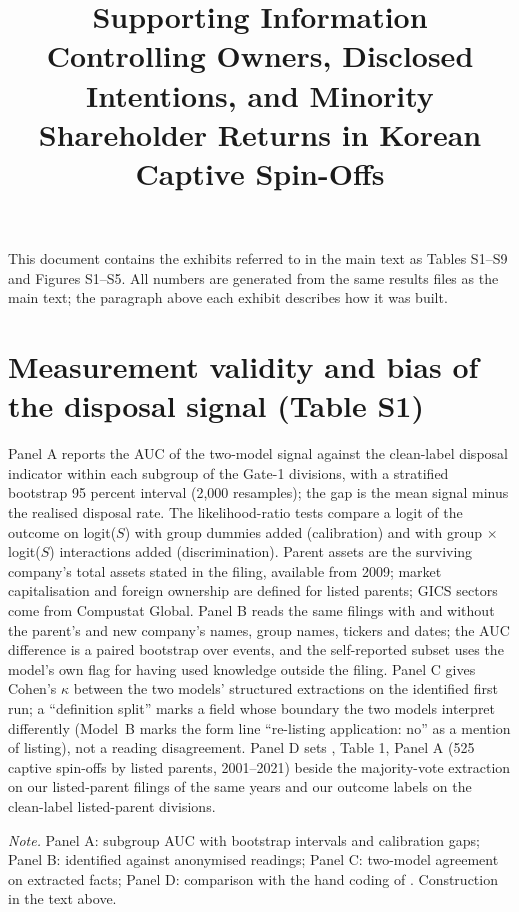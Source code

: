 \documentclass[12pt]{article}
\title{Supporting Information\\[4pt]\large Controlling Owners, Disclosed Intentions, and Minority Shareholder Returns in Korean Captive Spin-Offs}\author{}\date{}
\newcommand{\tabnote}[1]{\par\vspace{4pt}\begin{minipage}{\linewidth}\singlespacing\small\emph{Note.} #1\end{minipage}}
\newcommand{\captive}{captive spin-off}
\begin{document}
\maketitle
\noindent This document contains the exhibits referred to in the main text as Tables S1--S9 and Figures S1--S5. All numbers are generated from the same results files as the main text; the paragraph above each exhibit describes how it was built.

\section{Measurement validity and bias of the disposal signal (Table S1)}
Panel A reports the AUC of the two-model signal against the clean-label disposal indicator within each subgroup of the \ValN{} Gate-1 divisions, with a stratified bootstrap 95 percent interval (2,000 resamples); the gap is the mean signal minus the realised disposal rate. The likelihood-ratio tests compare a logit of the outcome on logit($S$) with group dummies added (calibration) and with group $\times$ logit($S$) interactions added (discrimination). Parent assets are the surviving company's total assets stated in the filing, available from 2009; market capitalisation and foreign ownership are defined for listed parents; GICS sectors come from Compustat Global. Panel B reads the same filings with and without the parent's and new company's names, group names, tickers and dates; the AUC difference is a paired bootstrap over events, and the self-reported subset uses the model's own flag for having used knowledge outside the filing. Panel C gives Cohen's $\kappa$ between the two models' structured extractions on the identified first run; a ``definition split'' marks a field whose boundary the two models interpret differently (Model~B marks the form line ``re-listing application: no'' as a mention of listing), not a reading disagreement. Panel D sets , Table 1, Panel A (525 \captive{}s by listed parents, 2001--2021) beside the majority-vote extraction on our listed-parent filings of the same years and our outcome labels on the clean-label listed-parent divisions.
\begin{table}\centering\caption{Validity and bias of the disposal signal}\label{tab:s_validity}
{\scriptsize\setlength{\tabcolsep}{3pt}}
\tabnote{Panel A: subgroup AUC with bootstrap intervals and calibration gaps; Panel B: identified against anonymised readings; Panel C: two-model agreement on extracted facts; Panel D: comparison with the hand coding of \citeA{kang2025}. Construction in the text above.}
\end{table}
\end{document}
